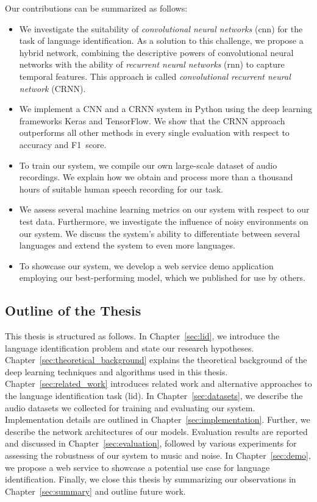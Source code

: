 Our contributions can be summarized as follows:
\begin{itemize}
	\item We investigate the suitability of \emph{convolutional neural networks} (\ac{cnn}) for the task of language identification. As a solution to this challenge, we propose a hybrid network, combining the descriptive powers of convolutional neural networks with the ability of \emph{recurrent neural networks} (\ac{rnn}) to capture temporal features. This approach is called \emph{convolutional recurrent neural network} (CRNN).
	\item We implement a CNN and a CRNN system in Python using the deep learning frameworks Keras and TensorFlow. We show that the CRNN approach outperforms all other methods in every single evaluation with respect to accuracy and F1~score.
	\item To train our system, we compile our own large-scale dataset of audio recordings. We explain how we obtain and process more than a thousand hours of suitable human speech recording for our task.
	\item We assess several machine learning metrics on our system with respect to our test data. Furthermore, we investigate the influence of noisy environments on our system. We discuss the system's ability to differentiate between several languages and extend the system to even more languages.
	\item To showcase our system, we develop a web service demo application employing our best-performing model, which we published for use by others.
\end{itemize}


\subsection{Outline of the Thesis}
This thesis is structured as follows. In Chapter~\ref{sec:lid}, we introduce the language identification problem and state our research hypotheses. Chapter~\ref{sec:theoretical_background} explains the theoretical background of the deep learning techniques and algorithms used in this thesis. Chapter~\ref{sec:related_work} introduces related work and alternative approaches to the language identification task (\ac{lid}). In Chapter~\ref{sec:datasets}, we describe the audio datasets we collected for training and evaluating our system. Implementation details are outlined in Chapter~\ref{sec:implementation}. Further, we describe the network architectures of our models. Evaluation results are reported and discussed in Chapter~\ref{sec:evaluation}, followed by various experiments for assessing the robustness of our system to music and noise. In Chapter~\ref{sec:demo}, we propose a web service to showcase a potential use case for language identification. Finally, we close this thesis by summarizing our observations in Chapter~\ref{sec:summary} and outline future work.
